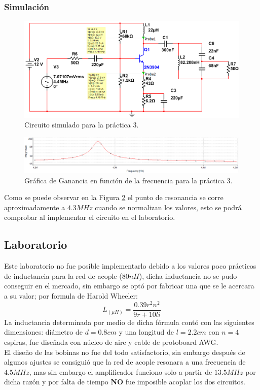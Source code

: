 \documentclass[11pt,graphicx,caption,rotating]{article}
\begin{document}
\subsubsection{Simulación}
\begin{figure}[H]
	\centering
		\includegraphics[scale=0.5]{circuito_lab_3.png}
	\caption{Circuito simulado para la práctica $3$.}
	\label{fig12}
\end{figure}
\begin{figure}[H]
	\centering
		\includegraphics[scale=0.5]{simulation_lab_3.png}
	\caption{Gráfica de Ganancia en función de la frecuencia para la práctica $3$.}
	\label{fig13}
\end{figure}
\noindent
Como se puede observar en la Figura \ref{fig13} el punto de resonancia se corre aproximadamente a $4.3MHz$ cuando se normalizan los valores, esto se podrá comprobar al implementar el circuito en el laboratorio.

\subsection{Laboratorio}
\noindent
Este laboratorio no fue posible implementarlo debido a los valores poco prácticos de inductancia para la red de acople ($80 nH$), dicha inductancia no se pudo conseguir en el mercado, sin embargo se optó por fabricar una que se le acercara a su valor;  por formula de Harold Wheeler:
\begin{equation}
 L_{\left( {\mu H} \right)}  = \frac{{0.39r^2 n^2 }}{{9r + 10li}}
\label{ecu17}
\end{equation}
\noindent
La inductancia determinada por medio de dicha fórmula contó con las siguientes dimensiones: diámetro de $d=0.8 cm$ y una longitud de $l=2.2 cm$ con $n=4$ espiras, fue diseñada con núcleo de aire y cable de protoboard AWG.\\
El diseño de las bobinas no fue del todo satisfactorio, sin embargo después de algunos ajustes se consiguió que la red de acople resonara a una frecuencia de $4.5 MHz$,  mas sin embargo el amplificador funciono solo a partir de $13.5 MHz$ por dicha razón y por falta de tiempo \textbf{NO} fue imposible acoplar los dos circuitos.
\end{document}

